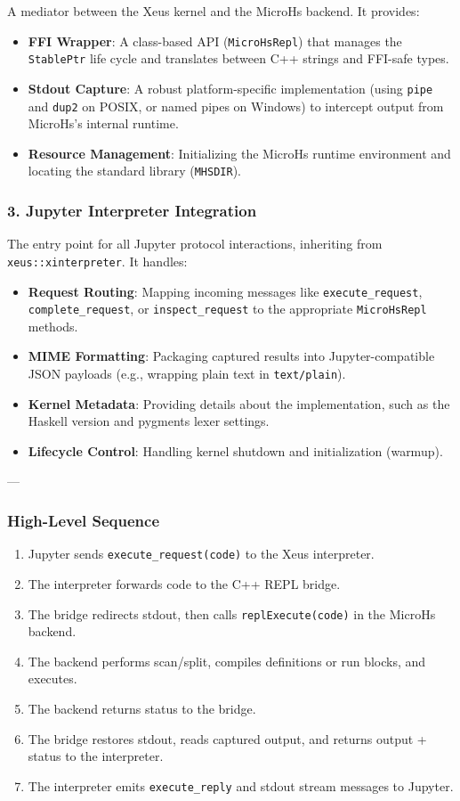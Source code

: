 A mediator between the Xeus kernel and the MicroHs backend. It provides:
\begin{itemize}
\item \textbf{FFI Wrapper}: A class-based API (\texttt{MicroHsRepl}) that manages the \texttt{StablePtr} life cycle and translates between C++ strings and FFI-safe types.
\item \textbf{Stdout Capture}: A robust platform-specific implementation (using \texttt{pipe} and \texttt{dup2} on POSIX, or named pipes on Windows) to intercept output from MicroHs's internal runtime.
\item \textbf{Resource Management}: Initializing the MicroHs runtime environment and locating the standard library (\texttt{MHSDIR}).
\end{itemize}


\subsubsection{3. Jupyter Interpreter Integration}


The entry point for all Jupyter protocol interactions, inheriting from \texttt{xeus::xinterpreter}. It handles:
\begin{itemize}
\item \textbf{Request Routing}: Mapping incoming messages like \texttt{execute\_request}, \texttt{complete\_request}, or \texttt{inspect\_request} to the appropriate \texttt{MicroHsRepl} methods.
\item \textbf{MIME Formatting}: Packaging captured results into Jupyter-compatible JSON payloads (e.g., wrapping plain text in \texttt{text/plain}).
\item \textbf{Kernel Metadata}: Providing details about the implementation, such as the Haskell version and pygments lexer settings.
\item \textbf{Lifecycle Control}: Handling kernel shutdown and initialization (warmup).
\end{itemize}


---
\subsubsection{High-Level Sequence}


\begin{enumerate}
\item Jupyter sends \texttt{execute\_request(code)} to the Xeus interpreter.
\item The interpreter forwards code to the C++ REPL bridge.
\item The bridge redirects stdout, then calls \texttt{replExecute(code)} in the MicroHs backend.
\item The backend performs scan/split, compiles definitions or run blocks, and executes.
\item The backend returns status to the bridge.
\item The bridge restores stdout, reads captured output, and returns output + status to the interpreter.
\item The interpreter emits \texttt{execute\_reply} and stdout stream messages to Jupyter.
\end{enumerate}


